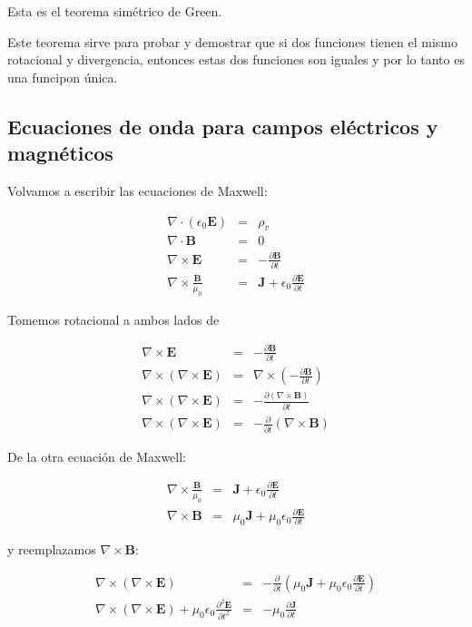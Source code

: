 Esta es el teorema simétrico de Green.

Este teorema sirve para probar y demostrar que si dos funciones tienen el mismo rotacional y divergencia, entonces estas dos funciones son iguales y por lo tanto es una funcipon única.

\subsection{Ecuaciones de onda para campos eléctricos y magnéticos}

Volvamos a escribir las ecuaciones de Maxwell:

\begin{eqnarray*}
\nabla \cdot (\epsilon_0 \mathbf{E}) &=& \rho_v \\
\nabla \cdot \mathbf{B} &=& 0 \\
\nabla \times \mathbf{E} &=& - \frac{\partial \mathbf{B}}{\partial t} \\
\nabla \times \frac{\mathbf{B}}{\mu_0} &=& \mathbf{J} + \epsilon_0 \frac{\partial \mathbf{E}}{\partial t} 
\end{eqnarray*}

Tomemos rotacional a ambos lados de 

\begin{eqnarray*}
\nabla \times \mathbf{E} &=& - \frac{\partial \mathbf{B}}{\partial t} \\
\nabla \times \left( \nabla \times \mathbf{E} \right) &=& \nabla \times \left( - \frac{\partial \mathbf{B}}{\partial t} \right) \\
\nabla \times \left( \nabla \times \mathbf{E} \right) &=& - \frac{\partial \left( \nabla \times \mathbf{B} \right)}{\partial t} \\
\nabla \times \left( \nabla \times \mathbf{E} \right) &=& - \frac{\partial}{\partial t} \left( \nabla \times \mathbf{B} \right)
\end{eqnarray*}

De la otra ecuación de Maxwell:

\begin{eqnarray*}
\nabla \times \frac{\mathbf{B}}{\mu_0} &=& \mathbf{J} + \epsilon_0 \frac{\partial \mathbf{E}}{\partial t} \\
\nabla \times \mathbf{B} &=& \mu_0 \mathbf{J} +  \mu_0 \epsilon_0 \frac{\partial \mathbf{E}}{\partial t} 
\end{eqnarray*}

y reemplazamos $\nabla \times \mathbf{B}$:

\begin{eqnarray*}
\nabla \times \left( \nabla \times \mathbf{E} \right) &=& - \frac{\partial}{\partial t} \left( \mu_0 \mathbf{J} +  \mu_0 \epsilon_0 \frac{\partial \mathbf{E}}{\partial t}  \right) \\
\nabla \times \left( \nabla \times \mathbf{E} \right) + \mu_0 \epsilon_0 \frac{\partial^2 \mathbf{E}}{\partial t^2} &=& -\mu_0 \frac{\partial \mathbf{J}}{\partial t}
\end{eqnarray*}

